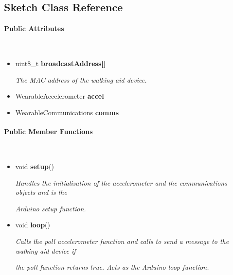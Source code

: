 \subsection{Sketch Class Reference}
\label{subsec:sketch_wearable}\mbox{}

    \paragraph{Public Attributes}\mbox{}\\

        \begin{itemize}
            \item uint8\_t \textbf{broadcastAddress[]}
            
                \quad \quad \textit{The MAC address of the walking aid device.}

            \item WearableAccelerometer \textbf{accel}

            \item WearableCommunications \textbf{comms}\\

        \end{itemize}


    \paragraph{Public Member Functions}\mbox{}\\

        \begin{itemize}
            \item void \textbf{setup}() 
            
                \quad \quad \textit{Handles the initialisation of the accelerometer and the communications objects and is the }

                \quad \quad \textit{Arduino setup function.}


            \item void \textbf{loop}() 
            
                \quad \quad \textit{Calls the poll accelerometer function and calls to send a message to the walking aid device if }
                
                \quad \quad \textit{the poll function returns true. Acts as the Arduino loop function.}\\
        \end{itemize}


